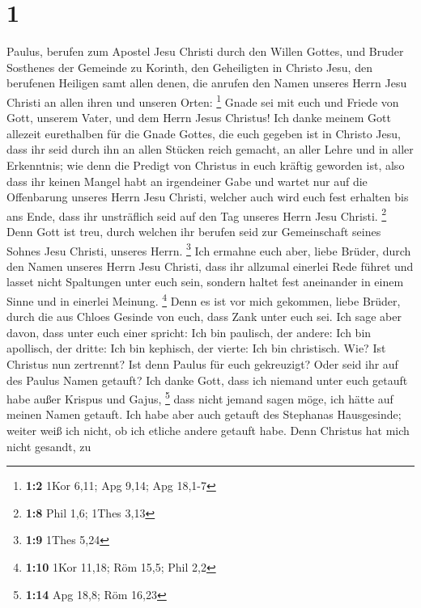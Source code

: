 \hypertarget{section}{%
\section{1}\label{section}}

 Paulus, berufen zum Apostel Jesu Christi durch den Willen
Gottes, und Bruder Sosthenes  der Gemeinde zu Korinth, den
Geheiligten in Christo Jesu, den berufenen Heiligen samt allen denen,
die anrufen den Namen unseres Herrn Jesu Christi an allen ihren und
unseren Orten: \footnote{\textbf{1:2} 1Kor 6,11; Apg 9,14; Apg 18,1-7}
 Gnade sei mit euch und Friede von Gott, unserem Vater,
und dem Herrn Jesus Christus!  Ich danke meinem Gott
allezeit eurethalben für die Gnade Gottes, die euch gegeben ist in
Christo Jesu,  dass ihr seid durch ihn an allen Stücken
reich gemacht, an aller Lehre und in aller Erkenntnis; 
wie denn die Predigt von Christus in euch kräftig geworden ist,
 also dass ihr keinen Mangel habt an irgendeiner Gabe und
wartet nur auf die Offenbarung unseres Herrn Jesu Christi,
 welcher auch wird euch fest erhalten bis ans Ende, dass
ihr unsträflich seid auf den Tag unseres Herrn Jesu Christi. \footnote{\textbf{1:8}
  Phil 1,6; 1Thes 3,13}  Denn Gott ist treu, durch welchen
ihr berufen seid zur Gemeinschaft seines Sohnes Jesu Christi, unseres
Herrn. \footnote{\textbf{1:9} 1Thes 5,24}  Ich ermahne
euch aber, liebe Brüder, durch den Namen unseres Herrn Jesu Christi,
dass ihr allzumal einerlei Rede führet und lasset nicht Spaltungen unter
euch sein, sondern haltet fest aneinander in einem Sinne und in einerlei
Meinung. \footnote{\textbf{1:10} 1Kor 11,18; Röm 15,5; Phil 2,2}
 Denn es ist vor mich gekommen, liebe Brüder, durch die
aus Chloes Gesinde von euch, dass Zank unter euch sei. 
Ich sage aber davon, dass unter euch einer spricht: Ich bin paulisch,
der andere: Ich bin apollisch, der dritte: Ich bin kephisch, der vierte:
Ich bin christisch.  Wie? Ist Christus nun zertrennt? Ist
denn Paulus für euch gekreuzigt? Oder seid ihr auf des Paulus Namen
getauft?  Ich danke Gott, dass ich niemand unter euch
getauft habe außer Krispus und Gajus, \footnote{\textbf{1:14} Apg 18,8;
  Röm 16,23}  dass nicht jemand sagen möge, ich hätte auf
meinen Namen getauft.  Ich habe aber auch getauft des
Stephanas Hausgesinde; weiter weiß ich nicht, ob ich etliche andere
getauft habe.  Denn Christus hat mich nicht gesandt, zu
